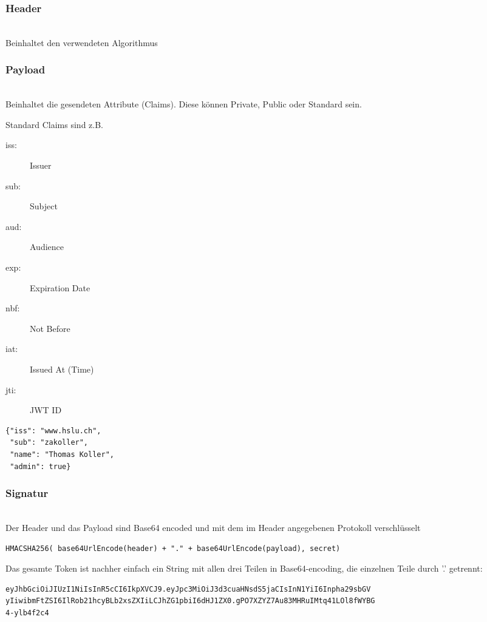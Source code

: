\documentclass[a4paper, 11pt]{article}
\begin{document}
\subsubsection{Header}\mbox{}\\
Beinhaltet den verwendeten Algorithmus

\subsubsection{Payload}\mbox{}\\
Beinhaltet die gesendeten Attribute (Claims). Diese können Private, Public oder Standard sein.

Standard Claims sind z.B.

\begin{multicols}{2}
	\begin{description}
		\item[iss: ] Issuer
		\item[sub: ] Subject
		\item[aud: ] Audience
		\item[exp: ] Expiration Date
		\item[nbf: ] Not Before
		\item[iat: ] Issued At (Time)
		\item[jti: ] JWT ID
	\end{description}
\end{multicols}

\begin{lstlisting}
{"iss": "www.hslu.ch",
 "sub": "zakoller",
 "name": "Thomas Koller",
 "admin": true}
\end{lstlisting}

\subsubsection{Signatur}\mbox{}\\
Der Header und das Payload sind Base64 encoded und mit dem im Header angegebenen Protokoll verschlüsselt
\begin{lstlisting}
HMACSHA256( base64UrlEncode(header) + "." + base64UrlEncode(payload), secret)
\end{lstlisting}

\vspace{10px}

\noindent Das gesamte Token ist nachher einfach ein String mit allen drei Teilen in Base64-encoding, die einzelnen Teile durch '.' getrennt:
\begin{lstlisting}
eyJhbGciOiJIUzI1NiIsInR5cCI6IkpXVCJ9.eyJpc3MiOiJ3d3cuaHNsdS5jaCIsInN1YiI6Inpha29sbGV
yIiwibmFtZSI6IlRob21hcyBLb2xsZXIiLCJhZG1pbiI6dHJ1ZX0.gPO7XZYZ7Au83MHRuIMtq41LOl8fWYBG
4-ylb4f2c4
\end{lstlisting}
\end{document}
